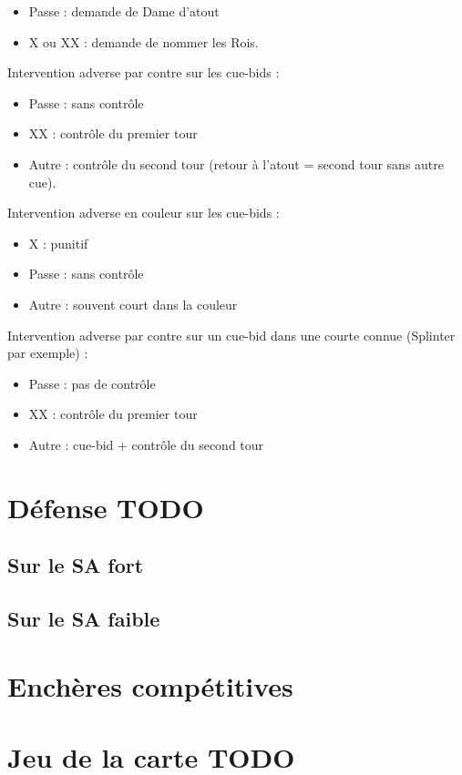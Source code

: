 \documentclass[a4paper]{article}
\begin{document}
\begin{itemize}
\item Passe : demande de Dame d'atout

\item X ou XX : demande de nommer les Rois.

\end{itemize}

Intervention adverse par contre sur les cue-bids :

\begin{itemize}
\item Passe : sans contrôle

\item XX : contrôle du premier tour

\item Autre : contrôle du second tour (retour à l'atout = second tour sans autre cue).

\end{itemize}

Intervention adverse en couleur sur les cue-bids :

\begin{itemize}
\item X : punitif

\item Passe : sans contrôle

\item Autre : souvent court dans la couleur

\end{itemize}

Intervention adverse par contre sur un cue-bid dans une courte connue (Splinter par exemple) :

\begin{itemize}
\item Passe : pas de contrôle

\item XX : contrôle du premier tour

\item Autre : cue-bid + contrôle du second tour

\end{itemize}

\section{Défense TODO}

\subsection{Sur le SA fort}

\subsection{Sur le SA faible}

\section{Enchères compétitives}

\section{Jeu de la carte TODO
}
\end{document}
